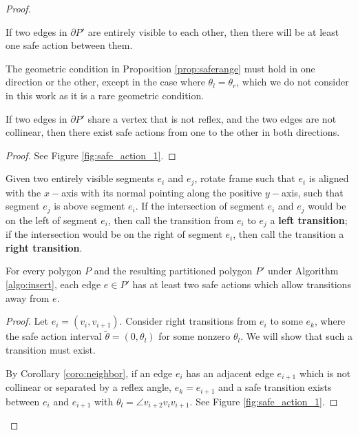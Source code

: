 \documentclass[]{styles/svproc}  %
\begin{document}
\begin{proof}
\begin{lemma}
If two edges in $\partial P'$ are entirely visible to each other, then there will be at least one safe
action between them.
\end{lemma}

The geometric condition in Proposition \ref{prop:saferange} must hold in one
direction or the other, except in the case where $\theta_l = \theta_r$, which we
do not consider in this work as it is a rare geometric condition.

\begin{corollary} \label{coro:neighbor}
If two edges in $\partial P'$ share a vertex that is not reflex, and the two
 edges are not collinear, then there exist safe actions
from one to the other in both directions.
\end{corollary}

\begin{proof}
See Figure \ref{fig:safe_action_1}.
\end{proof}

\begin{definition}
Given two entirely visible segments $e_i$ and $e_j$,
rotate frame such that $e_i$ is aligned with the $x-$axis with its normal pointing
along the positive $y-$axis, such that 
segment $e_j$ is above segment $e_i$. If the intersection of segment $e_i$ and
$e_j$ would be on the left of segment $e_i$, then call the transition from $e_i$ to $e_j$ a
\textbf{left
transition}; if the intersection would be on the right of segment $e_i$, then call the
transition a \textbf{right transition}.
\end{definition}

\begin{proposition} \label{prop:twosafe}
For every polygon $P$ and the resulting partitioned polygon $P'$ under Algorithm
\ref{algo:insert}, each edge $e \in P'$ has at least two safe actions which allow
transitions away from $e$.
\end{proposition}

\begin{proof}

Let $e_i = (v_i, v_{i+1})$. Consider right transitions from $e_i$ to some $e_k$,
where the safe action interval $\tilde{\theta} = (0, \theta_l)$ for some 
nonzero $\theta_l$. We will show that such a transition must exist. 

By Corollary \ref{coro:neighbor}, if an edge $e_i$ has an adjacent edge
$e_{i+1}$ which is not collinear or separated by a reflex angle, 
$e_k = e_{i+1}$ and a safe transition exists
between $e_i$ and $e_{i+1}$ with $\theta_l = \angle v_{i+2} v_i v_{i+1}$. 
See Figure \ref{fig:safe_action_1}.


\end{proof}
\end{proof}
\end{document}
